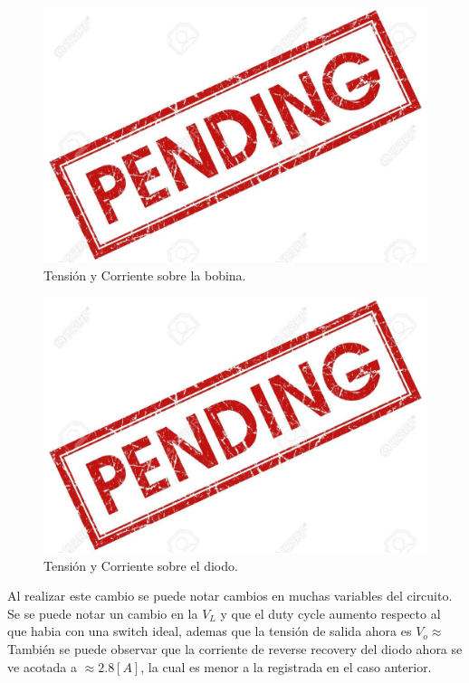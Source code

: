 \begin{multicols}{2}
\begin{figure}[H]
	\centering
	\includegraphics[width=0.9\linewidth]{ImagenesEjercicio-3/pend}
	\caption{Tensión y Corriente sobre la bobina.}
	\label{fig:ej3:Il_Vl}
\end{figure}
\begin{figure}[H]
	\centering
	\includegraphics[width=0.9\linewidth]{ImagenesEjercicio-3/pend}
	\caption{Tensión y Corriente sobre el diodo.}
	\label{fig:ej3:Id_Vd}
\end{figure}
\end{multicols}
Al realizar este cambio se puede notar cambios en muchas variables del circuito.
Se  se puede notar un cambio en la $V_L$ y que el duty cycle aumento respecto al que habia con una switch ideal, ademas que la tensión de salida ahora es $V_o \approx$
También se puede observar que la corriente de reverse recovery del diodo ahora se ve acotada a $\approx 2.8[A]$, la cual es menor a la registrada en el caso anterior.

